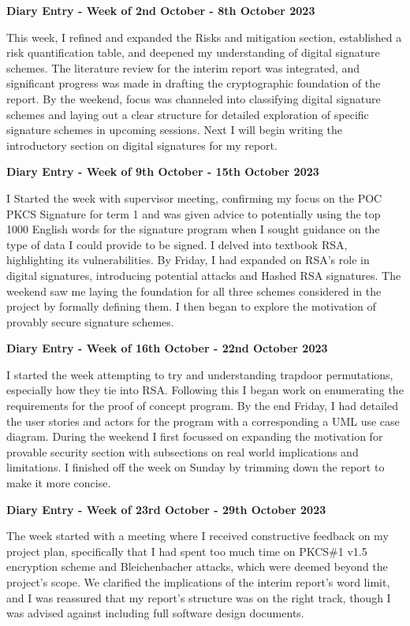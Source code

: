 \documentclass[]{final_report}
\theoremstyle{definition}
\begin{document}
\textbf{Diary Entry - Week of 2nd October - 8th October 2023}

This week, I refined and expanded the Risks and mitigation section, established a risk
quantification table, and deepened my understanding of digital signature schemes. The literature
review for the interim report was integrated, and significant progress was made in drafting the
cryptographic foundation of the report. By the weekend, focus was channeled into classifying digital
signature schemes and laying out a clear structure for detailed exploration of specific signature
schemes in upcoming sessions. Next I will begin writing the introductory section on digital
signatures for my report.

\textbf{Diary Entry - Week of 9th October - 15th October 2023}

I Started the week with supervisor meeting, confirming my focus on the POC PKCS Signature for term 1
and was given advice to potentially using the top 1000 English words for the signature program when
I sought guidance on the type of data I could provide to be signed. I delved into textbook RSA,
highlighting its vulnerabilities. By Friday, I had expanded on RSA's role in digital signatures,
introducing potential attacks and Hashed RSA signatures. The weekend saw me laying the foundation
for all three schemes considered in the project by formally defining them. I then began to explore
the motivation of provably secure signature schemes.

\textbf{Diary Entry - Week of 16th October - 22nd October 2023}

I started the week attempting to try and understanding trapdoor permutations, especially how they
tie into RSA. Following this I began work on enumerating the requirements for the proof of concept
program. By the end Friday, I had detailed the user stories and actors for the program with a
corresponding a UML use case diagram. During the weekend I first focussed on expanding the
motivation for provable security section with subsections on real world implications and
limitations. I finished off the week on Sunday by trimming down the report to make it more concise.

\textbf{Diary Entry - Week of 23rd October - 29th October 2023}

The week started with a meeting where I received constructive feedback on my project plan,
specifically that I had spent too much time on PKCS\#1 v1.5 encryption scheme and Bleichenbacher
attacks, which were deemed beyond the project’s scope. We clarified the implications of the interim
report's word limit, and I was reassured that my report’s structure was on the right track, though I
was advised against including full software design documents.
\end{document}

